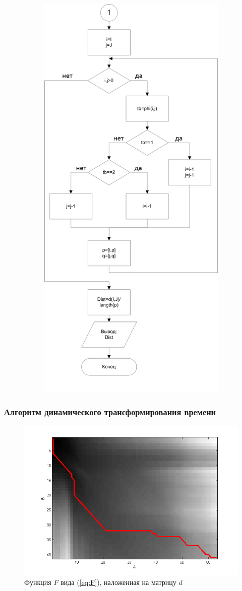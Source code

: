 \documentclass[slidestop, compress, mathserif, blackandwhite, utf8, serif, slidescentered]{beamer}
\begin{document}
\begin{frame}[plain]
\begin{figure}[h]
\begin{subfigure}{0.49\textwidth}
		\includegraphics[width=.59\textwidth]{../block2.png}			
	\end{subfigure}

	\label{block1}
\end{figure}
\end{frame}

\begin{frame}[plain]
	\frametitle{Алгоритм динамического трансформирования времени}
	\begin{figure}[h]	
	\centering
	\includegraphics[width=.7\textwidth]{../d_matrix.png}			
	\caption{Функция $F$ вида (\ref{eq:F}), наложенная на матрицу $d$}
	\label{d_matrix}
	\end{figure}
\end{frame}
\end{document}
